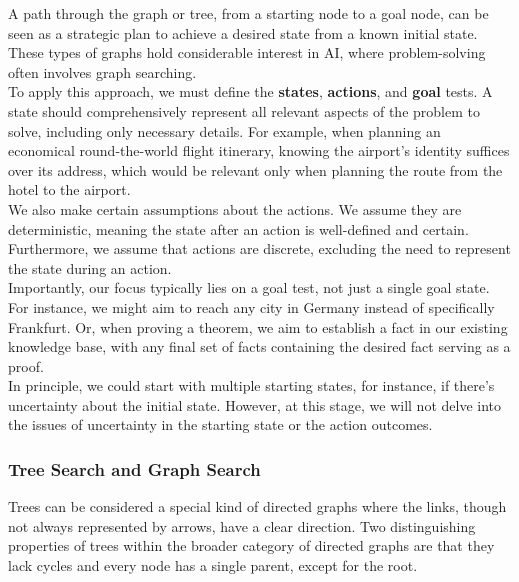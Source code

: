 \documentclass[a4paper,UKenglish,cleveref, autoref, thm-restate]{qlinhta}
\begin{document}
A path through the graph or tree, from a starting node to a goal node, can be seen as a strategic plan to achieve a desired state from a known initial state. These types of graphs hold considerable interest in AI, where problem-solving often involves graph searching.\\

To apply this approach, we must define the \textbf{states}, \textbf{actions}, and \textbf{goal} tests. A state should comprehensively represent all relevant aspects of the problem to solve, including only necessary details. For example, when planning an economical round-the-world flight itinerary, knowing the airport's identity suffices over its address, which would be relevant only when planning the route from the hotel to the airport.\\

We also make certain assumptions about the actions. We assume they are deterministic, meaning the state after an action is well-defined and certain. Furthermore, we assume that actions are discrete, excluding the need to represent the state during an action.\\

Importantly, our focus typically lies on a goal test, not just a single goal state. For instance, we might aim to reach any city in Germany instead of specifically Frankfurt. Or, when proving a theorem, we aim to establish a fact in our existing knowledge base, with any final set of facts containing the desired fact serving as a proof. \\

In principle, we could start with multiple starting states, for instance, if there's uncertainty about the initial state. However, at this stage, we will not delve into the issues of uncertainty in the starting state or the action outcomes.\\

\subsubsection{Tree Search and Graph Search}

Trees can be considered a special kind of directed graphs where the links, though not always represented by arrows, have a clear direction. Two distinguishing properties of trees within the broader category of directed graphs are that they lack cycles and every node has a single parent, except for the root.\\
\end{document}
